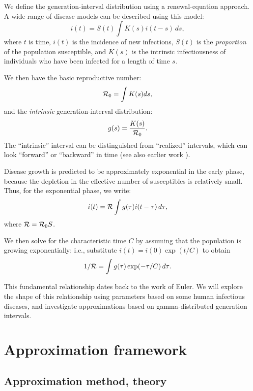 \documentclass[12pt]{article}
\newcommand{\RR}{\ensuremath{{\cal R}}}
\newcommand{\Rx}[1]{\ensuremath{{\cal R}_{#1}}}
\newcommand{\Ro}{\Rx{0}}
\newcommand{\Tc}{\ensuremath{C}}
\begin{document}
We define the generation-interval distribution using a renewal-equation approach.
A wide range of disease models can be described using this model: 
\begin{equation}
i(t) = S(t)\int{K(s)i(t-s) \,ds},
\label{eq:Renewal}
\end{equation}
where $t$ is time, $i(t)$ is the incidence of new infections, $S(t)$ is the \emph{proportion} of the population susceptible, and $K(s)$ is the intrinsic infectiousness of individuals who have been infected for a length of time $s$.

We then have the basic reproductive number: 
\begin{equation}
\Ro = \int{K(s)ds},
\end{equation}
and the \emph{intrinsic} generation-interval distribution:
\begin{equation}
g(s) = \frac{K(s)}{\Ro}.
\end{equation}
The ``intrinsic'' interval can be distinguished from ``realized'' intervals, which can look ``forward'' or ``backward'' in time \cite{ChamDush15} (see also earlier work \cite{Sven07,Nish10}).

Disease growth is predicted to be approximately exponential in the early phase, because the depletion in the effective number of susceptibles is relatively small.
Thus, for the exponential phase, we write:
\begin{equation}
i(t) = \RR\int{g(\tau)i(t-\tau) \,d\tau},
\end{equation}
where $\RR = \Ro S$.

We then solve for the characteristic time $\Tc$ by assuming that the population is growing exponentially: i.e., substitute $i(t) = i(0) \exp(t/\Tc)$ to obtain
\begin{equation}
	1/\RR = \int{g(\tau)\exp(-\tau/\Tc) \,d\tau}.\label{eq:Euler}
\end{equation}

This fundamental relationship dates back to the work of Euler. We will explore the shape of this relationship using parameters based on some human infectious diseases, and investigate approximations based on gamma-distributed generation intervals.

\section{Approximation framework}

\subsection{Approximation method, theory}
\end{document}
